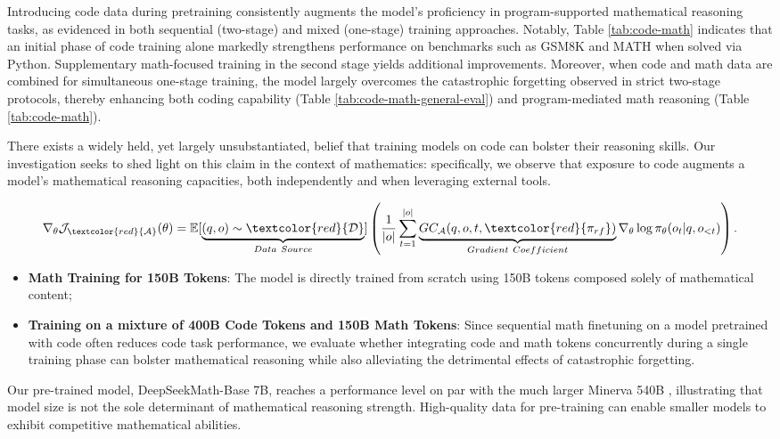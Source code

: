 {Introducing code data during pretraining consistently augments the model’s proficiency in program-supported mathematical reasoning tasks, as evidenced in both sequential (two-stage) and mixed (one-stage) training approaches. Notably, Table \ref{tab:code-math} indicates that an initial phase of code training alone markedly strengthens performance on benchmarks such as GSM8K and MATH when solved via Python. Supplementary math-focused training in the second stage yields additional improvements. Moreover, when code and math data are combined for simultaneous one-stage training, the model largely overcomes the catastrophic forgetting observed in strict two-stage protocols, thereby enhancing both coding capability (Table \ref{tab:code-math-general-eval}) and program-mediated math reasoning (Table \ref{tab:code-math}).

There exists a widely held, yet largely unsubstantiated, belief that training models on code can bolster their reasoning skills. Our investigation seeks to shed light on this claim in the context of mathematics: specifically, we observe that exposure to code augments a model's mathematical reasoning capacities, both independently and when leveraging external tools.

\begin{equation}
    \nabla_{\theta}\mathcal{J}_{\textcolor{red}{\mathcal{A}}}(\theta) = \mathbb{E}[\underbrace{(q,o) \sim \textcolor{red}{\mathcal{D}}}_{Data \ Source}]\left( \frac{1}{|o|} \sum_{t=1}^{|o|}  \underbrace{GC_{{\mathcal{A}}}(q, o, t, \textcolor{red}{\pi_{{rf}}})}_{Gradient \ Coefficient}  \nabla_{\theta}\log \pi_{\theta}(o_t | q, o_{<t})\right).
\label{eq:objective}
\end{equation}

\begin{itemize}[topsep=0pt]
    \item \textbf{Math Training for 150B Tokens}: The model is directly trained from scratch using 150B tokens composed solely of mathematical content;
    \item \textbf{Training on a mixture of 400B Code Tokens and 150B Math Tokens}: Since sequential math finetuning on a model pretrained with code often reduces code task performance, we evaluate whether integrating code and math tokens concurrently during a single training phase can bolster mathematical reasoning while also alleviating the detrimental effects of catastrophic forgetting.
\end{itemize}

    \item Our pre-trained model, DeepSeekMath-Base 7B, reaches a performance level on par with the much larger Minerva 540B \citep{minerva}, illustrating that model size is not the sole determinant of mathematical reasoning strength. High-quality data for pre-training can enable smaller models to exhibit competitive mathematical abilities.

}
